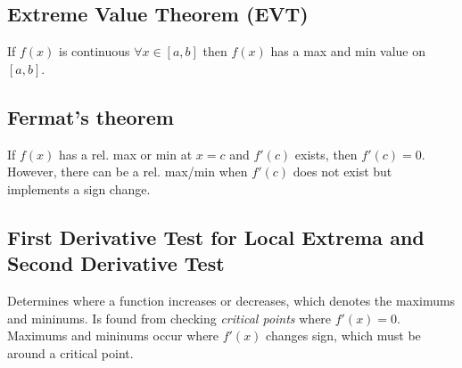 \subsection{Extreme Value Theorem (EVT)}\label{subsec:extreme-value-theoremnullevtnull}

If $f(x)$ is continuous $\forall x \in [a,b]$ then
$f(x)$ has a max and min value on $[a,b]$.

\bigskip{}

\subsection{Fermat's theorem}\label{subsec:fermat's-theorem}

If $f(x)$ has a rel. max or min at $x=c$ and $f'(c)$ exists, then $f'(c)=0$.
However, there can be a rel. max/min when $f'(c)$ does not exist but implements
a sign change. 

\subsection{First Derivative Test for Local Extrema and Second Derivative Test}\label{subsec:first-derivative-test-for-local-extrema-and-second-derivative-test}

Determines where a function increases or decreases, which
denotes the maximums and mininums.
Is found from checking \emph{critical points}
where $f'(x)=0$.
Maximums and mininums occur where $f'(x)$ changes sign, 
which must be around a critical point.

\bigskip{}\bigskip

